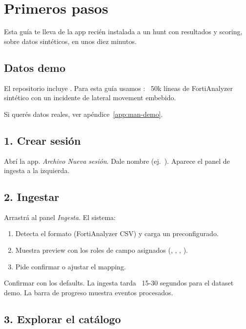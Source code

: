 \chapter{Primeros pasos}
\label{sec:man-quickstart}

Esta guía te lleva de la app recién instalada a un hunt con
resultados y scoring, sobre datos sintéticos, en unos diez
minutos.

\section{Datos demo}

El repositorio incluye . Para esta guía usamos
: ~50k líneas de
FortiAnalyzer sintético con un incidente de lateral movement
embebido.

Si querés datos reales, ver apéndice~\ref{app:man-demo}.

\section{1. Crear sesión}

Abrí la app. \emph{Archivo \textrightarrow{} Nueva sesión}. Dale
nombre (ej.\ ). Aparece el panel de ingesta
a la izquierda.

\section{2. Ingestar}

Arrastrá  al panel
\emph{Ingesta}. El sistema:

\begin{enumerate}
    \item Detecta el formato (FortiAnalyzer CSV) y carga un
     preconfigurado.
    \item Muestra preview con los roles de campo asignados
    (, , , ).
    \item Pide confirmar o ajustar el mapping.
\end{enumerate}

Confirmar con los defaults. La ingesta tarda ~15-30 segundos para
el dataset demo. La barra de progreso muestra eventos procesados.

\section{3. Explorar el catálogo}

